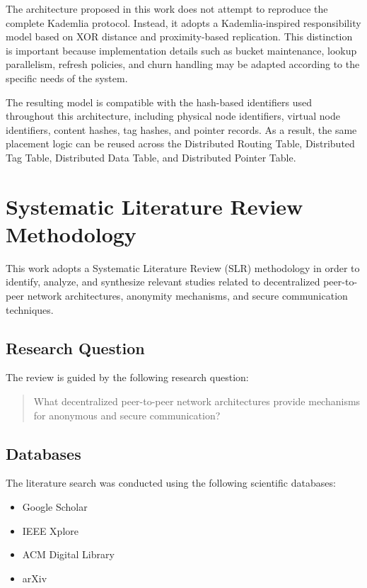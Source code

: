 \documentclass[12pt,a4paper]{article}
\begin{document}
The architecture proposed in this work does not attempt to reproduce the complete
Kademlia protocol. Instead, it adopts a Kademlia-inspired responsibility model based
on XOR distance and proximity-based replication. This distinction is important
because implementation details such as bucket maintenance, lookup parallelism,
refresh policies, and churn handling may be adapted according to the specific needs
of the system.

The resulting model is compatible with the hash-based identifiers used throughout
this architecture, including physical node identifiers, virtual node identifiers,
content hashes, tag hashes, and pointer records. As a result, the same placement
logic can be reused across the Distributed Routing Table, Distributed Tag Table,
Distributed Data Table, and Distributed Pointer Table.







\clearpage
\section{Systematic Literature Review Methodology}

This work adopts a Systematic Literature Review (SLR) methodology in order to identify, analyze, and synthesize relevant studies related to decentralized peer-to-peer network architectures, anonymity mechanisms, and secure communication techniques.

\subsection{Research Question}

The review is guided by the following research question:

\begin{quote}
What decentralized peer-to-peer network architectures provide mechanisms for anonymous and secure communication?
\end{quote}

\subsection{Databases}

The literature search was conducted using the following scientific databases:

\begin{itemize}
    \item Google Scholar
    \item IEEE Xplore
    \item ACM Digital Library
    \item arXiv
\end{itemize}
\end{document}

